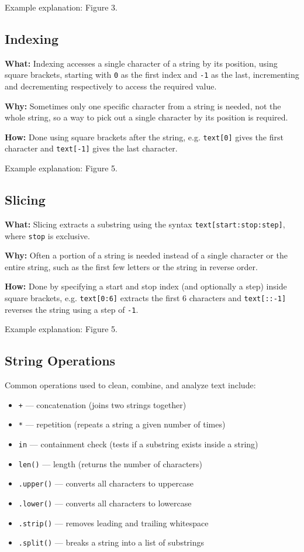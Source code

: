 \documentclass[11pt]{article}
\begin{document}
Example explanation: Figure 3.

\subsection{Indexing}
\textbf{What:} Indexing accesses a single character of a string by its position, using
square brackets, starting with \texttt{0} as the first index and \texttt{-1} as the last,
incrementing and decrementing respectively to access the required value.

\textbf{Why:} Sometimes only one specific character from a string is needed, not the
whole string, so a way to pick out a single character by its position is required.

\textbf{How:} Done using square brackets after the string, e.g. \texttt{text[0]} gives the
first character and \texttt{text[-1]} gives the last character.

Example explanation: Figure 5.


\subsection{Slicing}
\textbf{What:} Slicing extracts a substring using the syntax \texttt{text[start:stop:step]},
where \texttt{stop} is exclusive.

\textbf{Why:} Often a portion of a string is needed instead of a single character or the
entire string, such as the first few letters or the string in reverse order.

\textbf{How:} Done by specifying a start and stop index (and optionally a step) inside
square brackets, e.g. \texttt{text[0:6]} extracts the first 6 characters and
\texttt{text[::-1]} reverses the string using a step of \texttt{-1}.

Example explanation: Figure 5.


\subsection{String Operations}
Common operations used to clean, combine, and analyze text include:
\begin{itemize}[leftmargin=2em]
    \item \texttt{+} — concatenation (joins two strings together)
    \item \texttt{*} — repetition (repeats a string a given number of times)
    \item \texttt{in} — containment check (tests if a substring exists inside a string)
    \item \texttt{len()} — length (returns the number of characters)
    \item \texttt{.upper()} — converts all characters to uppercase
    \item \texttt{.lower()} — converts all characters to lowercase
    \item \texttt{.strip()} — removes leading and trailing whitespace
    \item \texttt{.split()} — breaks a string into a list of substrings
\end{itemize}
\end{document}
